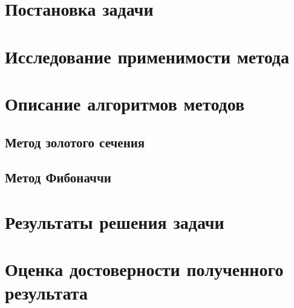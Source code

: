 \documentclass[main.tex]{subfiles}
\begin{document}
	
	\section{Постановка задачи}
	
	\section{Исследование применимости метода}
	
	\section{Описание алгоритмов методов}
	
	\subsection{Метод золотого сечения}
	
	\subsection{Метод Фибоначчи}
	
	\section{Результаты решения задачи}
	
	\section{Оценка достоверности полученного результата}
	
	\begin{thebibliography}{99}
		
	\end{thebibliography}
	
	
\end{document}
